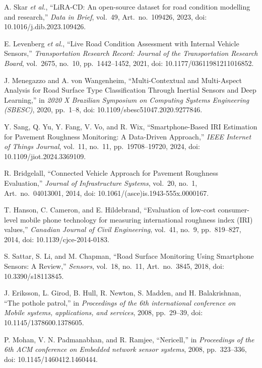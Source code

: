 A. Skar \emph{et al.}, ``LiRA-CD: An open-source dataset for road condition modelling and research,'' \emph{Data in Brief}, vol.~49, Art.~no.~109426, 2023, doi: 10.1016/j.dib.2023.109426.

E. Levenberg \emph{et al.}, ``Live Road Condition Assessment with Internal Vehicle Sensors,'' \emph{Transportation Research Record: Journal of the Transportation Research Board}, vol.~2675, no.~10, pp.~1442--1452, 2021, doi: 10.1177/03611981211016852.

J. Menegazzo and A. von Wangenheim, ``Multi-Contextual and Multi-Aspect Analysis for Road Surface Type Classification Through Inertial Sensors and Deep Learning,'' in \emph{2020 X Brazilian Symposium on Computing Systems Engineering (SBESC)}, 2020, pp.~1--8, doi: 10.1109/sbesc51047.2020.9277846.

Y. Sang, Q. Yu, Y. Fang, V. Vo, and R. Wix, ``Smartphone-Based IRI Estimation for Pavement Roughness Monitoring: A Data-Driven Approach,'' \emph{IEEE Internet of Things Journal}, vol.~11, no.~11, pp.~19708--19720, 2024, doi: 10.1109/jiot.2024.3369109.

R. Bridgelall, ``Connected Vehicle Approach for Pavement Roughness Evaluation,'' \emph{Journal of Infrastructure Systems}, vol.~20, no.~1, Art.~no.~04013001, 2014, doi: 10.1061/(asce)is.1943-555x.0000167.

T. Hanson, C. Cameron, and E. Hildebrand, ``Evaluation of low-cost consumer-level mobile phone technology for measuring international roughness index (IRI) values,'' \emph{Canadian Journal of Civil Engineering}, vol.~41, no.~9, pp.~819--827, 2014, doi: 10.1139/cjce-2014-0183.

S. Sattar, S. Li, and M. Chapman, ``Road Surface Monitoring Using Smartphone Sensors: A Review,'' \emph{Sensors}, vol.~18, no.~11, Art.~no.~3845, 2018, doi: 10.3390/s18113845.

J. Eriksson, L. Girod, B. Hull, R. Newton, S. Madden, and H. Balakrishnan, ``The pothole patrol,'' in \emph{Proceedings of the 6th international conference on Mobile systems, applications, and services}, 2008, pp.~29--39, doi: 10.1145/1378600.1378605.

P. Mohan, V. N. Padmanabhan, and R. Ramjee, ``Nericell,'' in \emph{Proceedings of the 6th ACM conference on Embedded network sensor systems}, 2008, pp.~323--336, doi: 10.1145/1460412.1460444.

